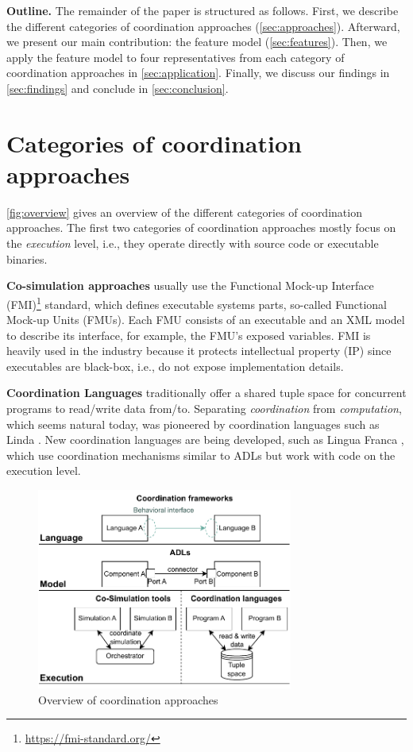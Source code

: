 \documentclass[runningheads]{llncs}
\begin{document}
\textbf{Outline.} The remainder of the paper is structured as follows.
First, we describe the different categories of coordination approaches (\autoref{sec:approaches}).
Afterward, we present our main contribution: the feature model (\autoref{sec:features}).
Then, we apply the feature model to four representatives from each category of coordination approaches in \autoref{sec:application}.
Finally, we discuss our findings in \autoref{sec:findings} and conclude in \autoref{sec:conclusion}.

\section{Categories of coordination approaches} \label{sec:approaches}

\autoref{fig:overview} gives an overview of the different categories of coordination approaches.
The first two categories of coordination approaches mostly focus on the \textit{execution} level, i.e., they operate directly with source code or executable binaries.

\textbf{Co-simulation approaches} usually use the Functional Mock-up Interface (FMI)\footnote{\url{https://fmi-standard.org/}} standard, which defines executable systems parts, so-called Functional Mock-up Units (FMUs).
Each FMU consists of an executable and an XML model to describe its interface, for example, the FMU's exposed variables.
FMI is heavily used in the industry because it protects intellectual property (IP) since executables are black-box, i.e., do not expose implementation details.

\textbf{Coordination Languages} traditionally offer a shared tuple space for concurrent programs to read/write data from/to.
Separating \textit{coordination} from \textit{computation}, which seems natural today, was pioneered by coordination languages such as Linda \cite{carrieroLindaContext1989}.
New coordination languages are being developed, such as Lingua Franca \cite{lohstrohReactorsDeterministicModel2020}, which use coordination mechanisms similar to ADLs but work with code on the execution level.

\begin{figure}[ht]
	\centering
	\includegraphics[width=0.75\textwidth]{images/overview}
	\caption{Overview of coordination approaches}
	\label{fig:overview}
\end{figure}
\end{document}
